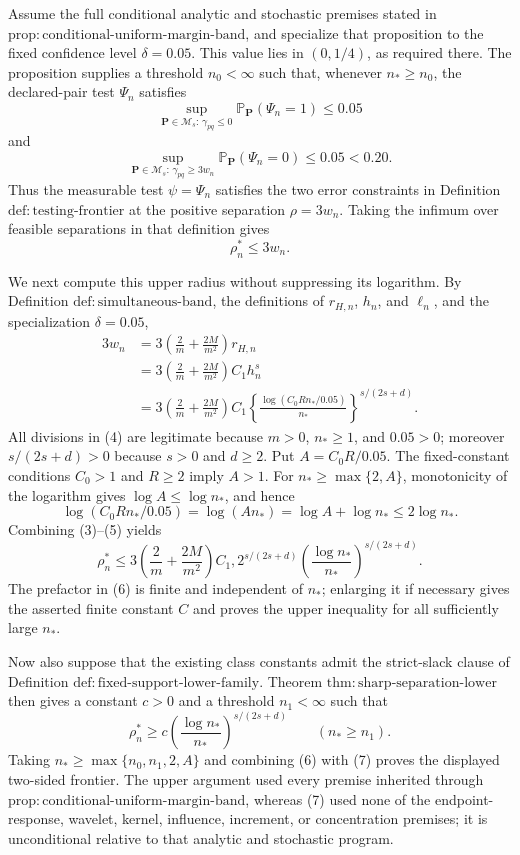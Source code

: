 Assume the full conditional analytic and stochastic premises stated in \(\mathrm{prop:conditional\text{-}uniform\text{-}margin\text{-}band}\), and specialize that proposition to the fixed confidence level \(\delta=0.05\).  This value lies in \((0,1/4)\), as required there.  The proposition supplies a threshold \(n_0<\infty\) such that, whenever \(n_\ast\ge n_0\), the declared-pair test \(\Psi_n\) satisfies
\[
 \sup_{\mathbf P\in\mathcal M_s:\,\gamma_{pq}\le0}
 \mathbb P_{\mathbf P}(\Psi_n=1)\le0.05
 \tag{1}
\]
and
\[
 \sup_{\mathbf P\in\mathcal M_s:\,\gamma_{pq}\ge3w_n}
 \mathbb P_{\mathbf P}(\Psi_n=0)\le0.05<0.20.
 \tag{2}
\]
Thus the measurable test \(\psi=\Psi_n\) satisfies the two error constraints in Definition \(\mathrm{def:testing\text{-}frontier}\) at the positive separation \(\rho=3w_n\).  Taking the infimum over feasible separations in that definition gives
\[
 \rho_n^\ast\le3w_n.
 \tag{3}
\]

We next compute this upper radius without suppressing its logarithm.  By Definition \(\mathrm{def:simultaneous\text{-}band}\), the definitions of \(r_{H,n}\), \(h_n\), and \(\ell_n\), and the specialization \(\delta=0.05\),
\[
\begin{aligned}
 3w_n
 &=3\left(\frac2m+\frac{2M}{m^2}\right)r_{H,n}\\
 &=3\left(\frac2m+\frac{2M}{m^2}\right)C_1h_n^s\\
 &=3\left(\frac2m+\frac{2M}{m^2}\right)C_1
 \left\{\frac{\log(C_0Rn_\ast/0.05)}{n_\ast}\right\}^{s/(2s+d)}.
 \tag{4}
\end{aligned}
\]
All divisions in (4) are legitimate because \(m>0\), \(n_\ast\ge1\), and \(0.05>0\); moreover \(s/(2s+d)>0\) because \(s>0\) and \(d\ge2\).  Put \(A=C_0R/0.05\).  The fixed-constant conditions \(C_0>1\) and \(R\ge2\) imply \(A>1\).  For \(n_\ast\ge\max\{2,A\}\), monotonicity of the logarithm gives \(\log A\le\log n_\ast\), and hence
\[
 \log(C_0Rn_\ast/0.05)=\log(An_\ast)
 =\log A+\log n_\ast\le2\log n_\ast.
 \tag{5}
\]
Combining (3)--(5) yields
\[
 \rho_n^\ast
 \le
 3\left(\frac2m+\frac{2M}{m^2}\right)C_1,2^{s/(2s+d)}
 \left(\frac{\log n_\ast}{n_\ast}\right)^{s/(2s+d)}.
 \tag{6}
\]
The prefactor in (6) is finite and independent of \(n_\ast\); enlarging it if necessary gives the asserted finite constant \(C\) and proves the upper inequality for all sufficiently large \(n_\ast\).

Now also suppose that the existing class constants admit the strict-slack clause of Definition \(\mathrm{def:fixed\text{-}support\text{-}lower\text{-}family}\).  Theorem \(\mathrm{thm:sharp\text{-}separation\text{-}lower}\) then gives a constant \(c>0\) and a threshold \(n_1<\infty\) such that
\[
 \rho_n^\ast\ge c
 \left(\frac{\log n_\ast}{n_\ast}\right)^{s/(2s+d)}
 \qquad(n_\ast\ge n_1).
 \tag{7}
\]
Taking \(n_\ast\ge\max\{n_0,n_1,2,A\}\) and combining (6) with (7) proves the displayed two-sided frontier.  The upper argument used every premise inherited through \(\mathrm{prop:conditional\text{-}uniform\text{-}margin\text{-}band}\), whereas (7) used none of the endpoint-response, wavelet, kernel, influence, increment, or concentration premises; it is unconditional relative to that analytic and stochastic program.
